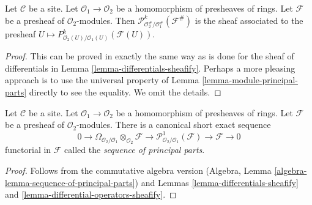 \begin{lemma}
\label{lemma-differential-operators-sheafify}
Let $\mathcal{C}$ be a site. Let $\mathcal{O}_1 \to \mathcal{O}_2$
be a homomorphism of presheaves of rings. Let $\mathcal{F}$ be a presheaf
of $\mathcal{O}_2$-modules. Then
$\mathcal{P}^k_{\mathcal{O}_2^\#/\mathcal{O}_1^\#}(\mathcal{F}^\#)$
is the sheaf associated to the presheaf
$U \mapsto P^k_{\mathcal{O}_2(U)/\mathcal{O}_1(U)}(\mathcal{F}(U))$.
\end{lemma}

\begin{proof}
This can be proved in exactly the same way as is done for the sheaf
of differentials in Lemma \ref{lemma-differentials-sheafify}.
Perhaps a more pleasing approach is to use the universal property
of Lemma \ref{lemma-module-principal-parts} directly to see the equality.
We omit the details.
\end{proof}

\begin{lemma}
\label{lemma-sequence-of-principal-parts}
Let $\mathcal{C}$ be a site. Let $\mathcal{O}_1 \to \mathcal{O}_2$
be a homomorphism of presheaves of rings. Let $\mathcal{F}$ be a presheaf
of $\mathcal{O}_2$-modules. There is a
canonical short exact sequence
$$
0 \to
\Omega_{\mathcal{O}_2/\mathcal{O}_1} \otimes_{\mathcal{O}_2} \mathcal{F} \to
\mathcal{P}^1_{\mathcal{O}_2/\mathcal{O}_1}(\mathcal{F}) \to
\mathcal{F} \to 0
$$
functorial in $\mathcal{F}$ called the {\it sequence of principal parts}.
\end{lemma}

\begin{proof}
Follows from the commutative algebra version
(Algebra, Lemma \ref{algebra-lemma-sequence-of-principal-parts})
and Lemmas \ref{lemma-differentials-sheafify} and
\ref{lemma-differential-operators-sheafify}.
\end{proof}

